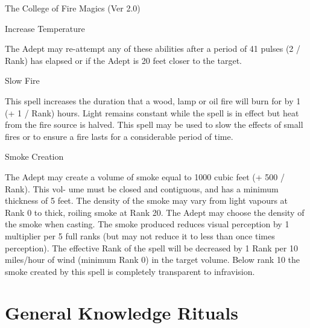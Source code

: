 \begin{Chapter}{The College of Fire Magics (Ver 2.0)}
\begin{spell}[G-6]{Increase Temperature }
\begin{effects}
The  Adept  may  re-attempt  any  of  these  abilities 
after a period of 41 pulses (2 / Rank) has elapsed or 
if the Adept is 20 feet closer to the target. 

\end{effects}
\end{spell}

\begin{spell}[G-7]{Slow Fire }

\begin{effects}
 This  spell  increases  the  duration  that  a 
wood,  lamp  or  oil  fire  will  burn  for  by  1  (+  1  / 
Rank) hours. Light remains constant while the spell 
is in effect but heat from the fire source is halved. 
This spell may be used to slow the effects of small 
fires  or  to  ensure  a  fire  lasts  for  a  considerable 
period of time. 

\end{effects}
\end{spell}

\begin{spell}[G-8]{Smoke Creation }

\begin{effects}
The Adept may create a volume of smoke 
equal to 1000 cubic feet (+ 500 / Rank). This vol-
ume  must  be  closed  and  contiguous,  and  has  a 
minimum  thickness  of  5  feet.  The  density  of  the 
smoke  may  vary  from  light  vapours  at  Rank  0  to 
thick,  roiling  smoke  at  Rank  20.  The  Adept  may 
choose the density of the smoke when casting. The 
smoke  produced  reduces  visual  perception  by  1 
multiplier per 5 full ranks (but may not reduce it to 
less  than  once  times  perception).  The  effective 
Rank of the spell will be decreased by 1 Rank per 
10  miles/hour  of  wind  (minimum  Rank  0)  in  the 
target volume. Below rank 10 the smoke created by 
this spell is completely transparent to infravision. 


\end{effects}
\end{spell}

\section{General Knowledge Rituals}


\end{Chapter}
